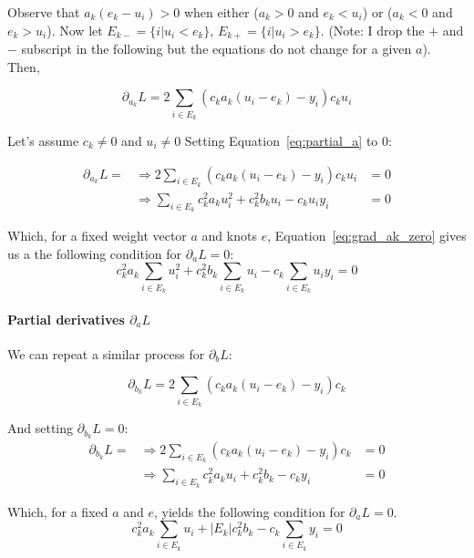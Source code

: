 Observe that $a_k(e_k - u_i) > 0$ when either ($a_k > 0$ and $e_k < u_i$) or ($a_k < 0$ and $e_k > u_i$). Now let $E_{k-} = \{i | u_i < e_k\}$, $E_{k+} = \{i | u_i > e_k\}$. (Note: I drop the $+$ and $-$ subscript in the following but the equations do not change for a given $a$). Then,

\begin{equation}\label{eq:partial_a}
    \partial_{a_k} L = 2 \sum_{i \in E_k} (c_k a_k(u_i - e_k) - y_i) c_k u_i
\end{equation}

Let's assume $c_k \neq 0$ and $u_i \neq 0$ Setting Equation~\ref{eq:partial_a} to 0:

\begin{align}
    \partial_{a_k} L = & \Rightarrow 2 \sum_{i \in E_k} (c_k a_k(u_i - e_k) - y_i) c_k u_i &= 0 \\
                       & \Rightarrow   \sum_{i \in E_k} c_k^2 a_k u_i^2 + c_k^2 b_k u_i - c_k u_i y_i &= 0
\end{align}

Which, for a fixed weight vector $a$ and knots $e$, Equation~\ref{eq:grad_ak_zero} gives us a the following condition for $\partial_a L = 0$:
\begin{equation}
    c_k^2 a_k \sum_{i \in E_k} u_i^2 + c_k^2 b_k \sum_{i \in E_k} u_i - c_k \sum_{i \in E_k} u_i y_i = 0 \label{eq:grad_ak_zero}
\end{equation}



\paragraph{Partial derivatives $\partial_a L$} We can repeat a similar process for $\partial_b L$:

\begin{equation}\label{eq:partial_b}
    \partial_{b_k} L = 2 \sum_{i \in E_k} (c_k a_k(u_i - e_k) - y_i) c_k
\end{equation}

And setting $\partial_{b_k} L = 0$:
\begin{align}
    \partial_{b_k} L = & \Rightarrow 2 \sum_{i \in E_k} (c_k a_k(u_i - e_k) - y_i) c_k &= 0 \\
                       & \Rightarrow   \sum_{i \in E_k} c_k^2 a_k u_i + c_k^2 b_k - c_k y_i &= 0
                       \label{eq:grad_bk_zero}
\end{align}

Which, for a fixed $a$ and $e$, yields the following condition for $\partial_a L = 0$.
\begin{equation}
    c_k^2 a_k \sum_{i \in E_k} u_i + |E_k| c_k^2 b_k - c_k \sum_{i \in E_k} y_i = 0
\end{equation}

